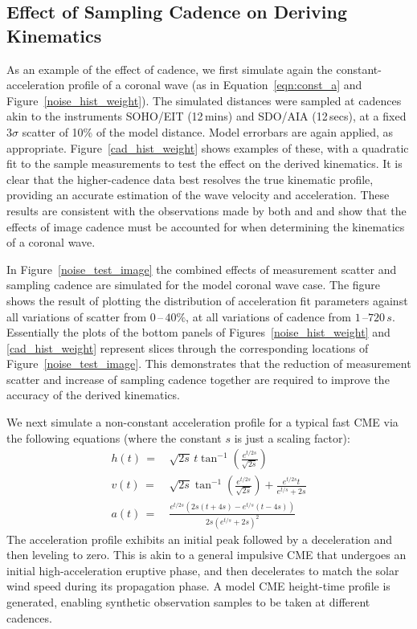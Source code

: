 \documentclass[structabstract]{aa}
\begin{document}
\subsection{Effect of Sampling Cadence on Deriving Kinematics}
\label{subsect:cadence}

As an example of the effect of cadence, we first simulate again the constant-acceleration profile of a coronal wave (as in Equation~\ref{eqn:const_a} and Figure~\ref{noise_hist_weight}). The simulated distances were sampled at cadences akin to the instruments SOHO/EIT (12\,mins) and SDO/AIA (12\,secs), at a fixed $3\sigma$ scatter of 10\% of the model distance. Model errorbars are again applied, as appropriate. Figure~\ref{cad_hist_weight} shows examples of these, with a quadratic fit to the sample measurements to test the effect on the derived kinematics. It is clear that the higher-cadence data best resolves the true kinematic profile, providing an accurate estimation of the wave velocity and acceleration. These results are consistent with the observations made by both \citet{2008ApJ...680L..81L} and \citet{2009ApJ...707..503M} and show that the effects of image cadence must be accounted for when determining the kinematics of a coronal wave.

In Figure~\ref{noise_test_image} the combined effects of measurement scatter and sampling cadence are simulated for the model coronal wave case. The figure shows the result of plotting the distribution of acceleration fit parameters against all variations of scatter from $0$\,--\,$40\%$, at all variations of cadence from $1$\,--$720\,s$. Essentially the plots of the bottom panels of Figures~\ref{noise_hist_weight} and \ref{cad_hist_weight} represent slices through the corresponding locations of Figure~\ref{noise_test_image}. This demonstrates that the reduction of measurement scatter and increase of sampling cadence together are required to improve the accuracy of the derived kinematics.

We next simulate a non-constant acceleration profile for a typical fast CME via the following equations (where the constant $s$ is just a scaling factor):
\begin{eqnarray}
h(t)\,=&\,\sqrt{2s}\,t\tan^{-1}\left(\frac{e^{t/2s}}{\sqrt{2s}}\right) \\
v(t)\,=&\,\sqrt{2s}\tan^{-1}\left(\frac{e^{t/2s}}{\sqrt{2s}}\right)+\frac{e^{t/2s}t}{e^{t/s}+2s} \\
a(t)\,=&\,\frac{e^{t/2s}\left(2s\left(t+4s\right)-e^{t/s}\left(t-4s\right)\right)}{2s\left(e^{t/s}+2s\right)^2}
\label{eqn:nonconst_a}
\end{eqnarray}
The acceleration profile exhibits an initial peak followed by a deceleration and then leveling to zero. This is akin to a general impulsive CME that undergoes an initial high-acceleration eruptive phase, and then decelerates to match the solar wind speed during its propagation phase. A model CME height-time profile is generated, enabling synthetic observation samples to be taken at different cadences. 
\end{document}
